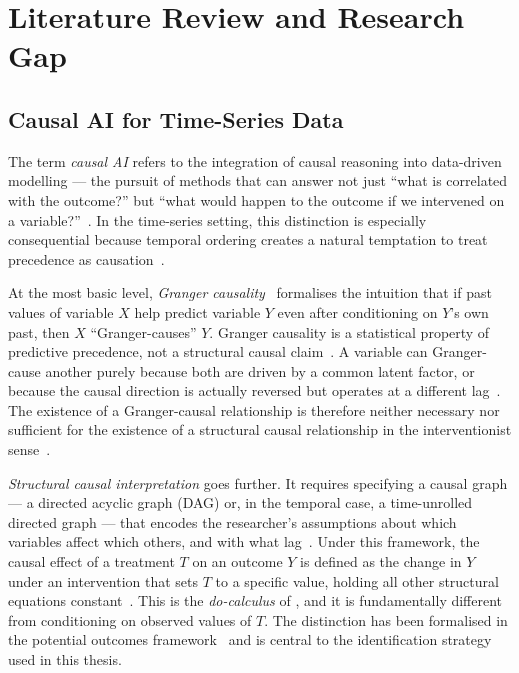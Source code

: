 
\section{Literature Review and Research Gap}
\label{sec:literature}

\subsection{Causal AI for Time-Series Data}
\label{sec:causal_ts}

The term \emph{causal AI} refers to the integration of causal
reasoning into data-driven modelling --- the pursuit of methods that
can answer not just ``what is correlated with the outcome?'' but
``what would happen to the outcome if we intervened on a
variable?''~\parencite{pearl2009, scholkopf2021}.
In the time-series setting, this distinction is especially
consequential because temporal ordering creates a natural temptation
to treat precedence as causation~\parencite{granger1969}.

At the most basic level, \emph{Granger causality}~\parencite{granger1969}
formalises the intuition that if past values of variable $X$ help
predict variable $Y$ even after conditioning on $Y$'s own past, then
$X$ ``Granger-causes'' $Y$.
Granger causality is a statistical property of predictive precedence,
not a structural causal claim~\parencite{granger1969}.
A variable can Granger-cause another purely because both are driven by
a common latent factor, or because the causal direction is actually
reversed but operates at a different lag~\parencite{pearl2009}.
The existence of a Granger-causal relationship is therefore neither
necessary nor sufficient for the existence of a structural causal
relationship in the interventionist sense~\parencite{pearl2009}.

\emph{Structural causal interpretation} goes further.
It requires specifying a causal graph --- a directed acyclic graph
(DAG) or, in the temporal case, a time-unrolled directed graph ---
that encodes the researcher's assumptions about which variables affect
which others, and with what lag~\parencite{pearl2009}.
Under this framework, the causal effect of a treatment $T$ on an
outcome $Y$ is defined as the change in $Y$ under an intervention
that sets $T$ to a specific value, holding all other structural
equations constant~\parencite{pearl2009}.
This is the \emph{do-calculus} of \textcite{pearl2009}, and it
is fundamentally different from conditioning on observed values of $T$.
The distinction has been formalised in the potential outcomes
framework~\parencite{rubin1974} and is central to the
identification strategy used in this thesis.

